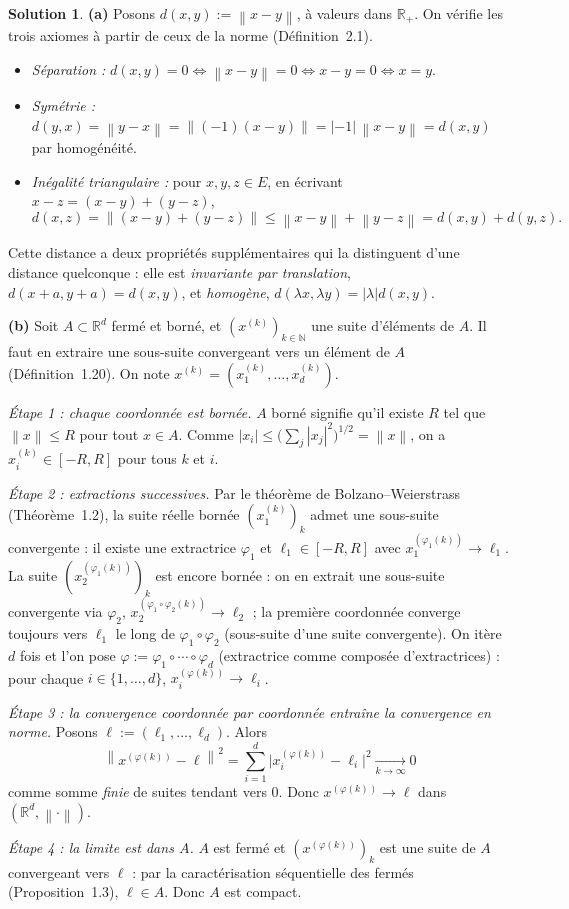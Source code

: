 \documentclass[11pt,a4paper]{article}
\newcommand{\R}{\mathbb{R}}
\newcommand{\N}{\mathbb{N}}
\newcommand{\norm}[1]{\left\|#1\right\|}
\theoremstyle{definition}
\newtheorem*{solution}{Solution}
\begin{document}
\begin{solution}
\noindent\textbf{(a)} Posons $d(x,y):=\norm{x-y}$, à valeurs dans $\R_+$. On vérifie les trois axiomes à partir de ceux de la norme (Définition~2.1).
\begin{itemize}
  \item \emph{Séparation :} $d(x,y)=0\iff\norm{x-y}=0\iff x-y=0\iff x=y$.
  \item \emph{Symétrie :} $d(y,x)=\norm{y-x}=\norm{(-1)(x-y)}=|-1|\,\norm{x-y}=d(x,y)$ par homogénéité.
  \item \emph{Inégalité triangulaire :} pour $x,y,z\in E$, en écrivant $x-z=(x-y)+(y-z)$,
  \[
  d(x,z)=\norm{(x-y)+(y-z)}\le\norm{x-y}+\norm{y-z}=d(x,y)+d(y,z).
  \]
\end{itemize}
Cette distance a deux propriétés supplémentaires qui la distinguent d'une distance quelconque : elle est \emph{invariante par translation}, $d(x+a,y+a)=d(x,y)$, et \emph{homogène}, $d(\lambda x,\lambda y)=|\lambda|d(x,y)$.

\medskip
\noindent\textbf{(b)} Soit $A\subset\R^d$ fermé et borné, et $(x^{(k)})_{k\in\N}$ une suite d'éléments de $A$. Il faut en extraire une sous-suite convergeant vers un élément de $A$ (Définition~1.20). On note $x^{(k)}=(x^{(k)}_1,\dots,x^{(k)}_d)$.

\emph{Étape 1 : chaque coordonnée est bornée.} $A$ borné signifie qu'il existe $R$ tel que $\norm{x}\le R$ pour tout $x\in A$. Comme $|x_i|\le\big(\sum_j|x_j|^2\big)^{1/2}=\norm x$, on a $x^{(k)}_i\in[-R,R]$ pour tous $k$ et $i$.

\emph{Étape 2 : extractions successives.} Par le théorème de Bolzano--Weierstrass (Théorème~1.2), la suite réelle bornée $(x^{(k)}_1)_k$ admet une sous-suite convergente : il existe une extractrice $\varphi_1$ et $\ell_1\in[-R,R]$ avec $x^{(\varphi_1(k))}_1\to\ell_1$. La suite $(x^{(\varphi_1(k))}_2)_k$ est encore bornée : on en extrait une sous-suite convergente via $\varphi_2$, $x^{(\varphi_1\circ\varphi_2(k))}_2\to\ell_2$ ; la première coordonnée converge toujours vers $\ell_1$ le long de $\varphi_1\circ\varphi_2$ (sous-suite d'une suite convergente). On itère $d$ fois et l'on pose $\varphi:=\varphi_1\circ\cdots\circ\varphi_d$ (extractrice comme composée d'extractrices) : pour chaque $i\in\{1,\dots,d\}$, $x^{(\varphi(k))}_i\to\ell_i$.

\emph{Étape 3 : la convergence coordonnée par coordonnée entraîne la convergence en norme.} Posons $\ell:=(\ell_1,\dots,\ell_d)$. Alors
\[
\norm{x^{(\varphi(k))}-\ell}^2=\sum_{i=1}^d\big|x^{(\varphi(k))}_i-\ell_i\big|^2\xrightarrow[k\to\infty]{}0
\]
comme somme \emph{finie} de suites tendant vers $0$. Donc $x^{(\varphi(k))}\to\ell$ dans $(\R^d,\norm\cdot)$.

\emph{Étape 4 : la limite est dans $A$.} $A$ est fermé et $(x^{(\varphi(k))})_k$ est une suite de $A$ convergeant vers $\ell$ : par la caractérisation séquentielle des fermés (Proposition~1.3), $\ell\in A$. Donc $A$ est compact.
\end{solution}
\end{document}
